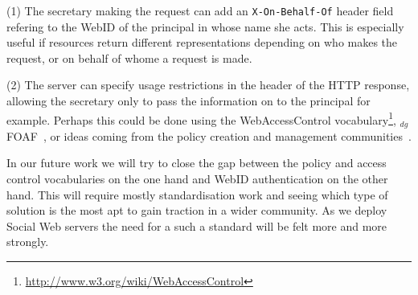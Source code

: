 \documentclass[a4paper]{llncs}
\begin{document}
(1) The secretary making the request can add an  \lstinline|X-On-Behalf-Of| header field refering to the WebID of the principal in whose name she acts.
This is especially useful if resources return different representations depending on who makes the request, or on behalf of whome a request is made.

(2) The server can specify usage restrictions in the header of the HTTP response, allowing the secretary only to pass the information on to the principal for example.  
Perhaps this could be done using the WebAccessControl vocabulary\footnote{\url{http://www.w3.org/wiki/WebAccessControl}}, $_{dg}$FOAF~\cite{schwagereit-f-2010-181-a}, or ideas coming from the policy creation and management communities~\cite{kagal-l-2005--a}.

In our future work we will try to close the gap between the policy and access control vocabularies on the one hand and WebID authentication on the other hand. This will require mostly standardisation work and seeing which type of solution is the most apt to gain traction in a wider community. As we deploy Social Web servers the need for a such a standard will be felt more and more strongly.


\end{document}
